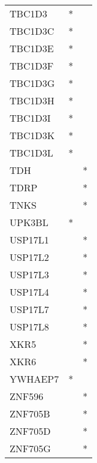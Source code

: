 \begin{longtable}{lcc}
TBC1D3       &              * &            \\
TBC1D3C      &              * &            \\
TBC1D3E      &              * &            \\
TBC1D3F      &              * &            \\
TBC1D3G      &              * &            \\
TBC1D3H      &              * &            \\
TBC1D3I      &              * &            \\
TBC1D3K      &              * &            \\
TBC1D3L      &              * &            \\
TDH          &                &          * \\
TDRP         &                &          * \\
TNKS         &                &          * \\
UPK3BL       &              * &            \\
USP17L1      &                &          * \\
USP17L2      &                &          * \\
USP17L3      &                &          * \\
USP17L4      &                &          * \\
USP17L7      &                &          * \\
USP17L8      &                &          * \\
XKR5         &                &          * \\
XKR6         &                &          * \\
YWHAEP7      &              * &            \\
ZNF596       &                &          * \\
ZNF705B      &                &          * \\
ZNF705D      &                &          * \\
ZNF705G      &                &          * \\
\end{longtable}
